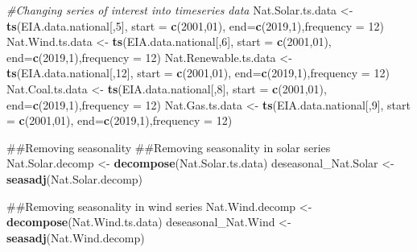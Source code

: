\documentclass[12pt,]{article}
\newenvironment{Shaded}{\begin{snugshade}}{\end{snugshade}}
\newcommand{\KeywordTok}[1]{\textcolor[rgb]{0.13,0.29,0.53}{\textbf{#1}}}
\newcommand{\DataTypeTok}[1]{\textcolor[rgb]{0.13,0.29,0.53}{#1}}
\newcommand{\DecValTok}[1]{\textcolor[rgb]{0.00,0.00,0.81}{#1}}
\newcommand{\StringTok}[1]{\textcolor[rgb]{0.31,0.60,0.02}{#1}}
\newcommand{\CommentTok}[1]{\textcolor[rgb]{0.56,0.35,0.01}{\textit{#1}}}
\newcommand{\NormalTok}[1]{#1}
\begin{document}
\begin{Shaded}
\begin{Highlighting}[]
\CommentTok{#Changing series of interest into timeseries data}
\NormalTok{Nat.Solar.ts.data <-}\StringTok{ }\KeywordTok{ts}\NormalTok{(EIA.data.national[,}\DecValTok{5}\NormalTok{], }
                        \DataTypeTok{start =} \KeywordTok{c}\NormalTok{(}\DecValTok{2001}\NormalTok{,}\DecValTok{01}\NormalTok{), }\DataTypeTok{end=}\KeywordTok{c}\NormalTok{(}\DecValTok{2019}\NormalTok{,}\DecValTok{1}\NormalTok{),}\DataTypeTok{frequency =} \DecValTok{12}\NormalTok{)}
\NormalTok{Nat.Wind.ts.data <-}\StringTok{ }\KeywordTok{ts}\NormalTok{(EIA.data.national[,}\DecValTok{6}\NormalTok{], }
                       \DataTypeTok{start =} \KeywordTok{c}\NormalTok{(}\DecValTok{2001}\NormalTok{,}\DecValTok{01}\NormalTok{), }\DataTypeTok{end=}\KeywordTok{c}\NormalTok{(}\DecValTok{2019}\NormalTok{,}\DecValTok{1}\NormalTok{),}\DataTypeTok{frequency =} \DecValTok{12}\NormalTok{)}
\NormalTok{Nat.Renewable.ts.data <-}\StringTok{ }\KeywordTok{ts}\NormalTok{(EIA.data.national[,}\DecValTok{12}\NormalTok{], }
                            \DataTypeTok{start =} \KeywordTok{c}\NormalTok{(}\DecValTok{2001}\NormalTok{,}\DecValTok{01}\NormalTok{), }\DataTypeTok{end=}\KeywordTok{c}\NormalTok{(}\DecValTok{2019}\NormalTok{,}\DecValTok{1}\NormalTok{),}\DataTypeTok{frequency =} \DecValTok{12}\NormalTok{)}
\NormalTok{Nat.Coal.ts.data <-}\StringTok{ }\KeywordTok{ts}\NormalTok{(EIA.data.national[,}\DecValTok{8}\NormalTok{], }
                       \DataTypeTok{start =} \KeywordTok{c}\NormalTok{(}\DecValTok{2001}\NormalTok{,}\DecValTok{01}\NormalTok{), }\DataTypeTok{end=}\KeywordTok{c}\NormalTok{(}\DecValTok{2019}\NormalTok{,}\DecValTok{1}\NormalTok{),}\DataTypeTok{frequency =} \DecValTok{12}\NormalTok{)}
\NormalTok{Nat.Gas.ts.data <-}\StringTok{ }\KeywordTok{ts}\NormalTok{(EIA.data.national[,}\DecValTok{9}\NormalTok{], }
                      \DataTypeTok{start =} \KeywordTok{c}\NormalTok{(}\DecValTok{2001}\NormalTok{,}\DecValTok{01}\NormalTok{), }\DataTypeTok{end=}\KeywordTok{c}\NormalTok{(}\DecValTok{2019}\NormalTok{,}\DecValTok{1}\NormalTok{),}\DataTypeTok{frequency =} \DecValTok{12}\NormalTok{)}

\NormalTok{##Removing seasonality}
\NormalTok{##Removing seasonality in solar series}
\NormalTok{Nat.Solar.decomp <-}\StringTok{ }\KeywordTok{decompose}\NormalTok{(Nat.Solar.ts.data)}
\NormalTok{deseasonal_Nat.Solar <-}\StringTok{ }\KeywordTok{seasadj}\NormalTok{(Nat.Solar.decomp)}

\NormalTok{##Removing seasonality in wind series}
\NormalTok{Nat.Wind.decomp <-}\StringTok{ }\KeywordTok{decompose}\NormalTok{(Nat.Wind.ts.data)}
\NormalTok{deseasonal_Nat.Wind <-}\StringTok{ }\KeywordTok{seasadj}\NormalTok{(Nat.Wind.decomp)}


\end{Highlighting}
\end{Shaded}
\end{document}
